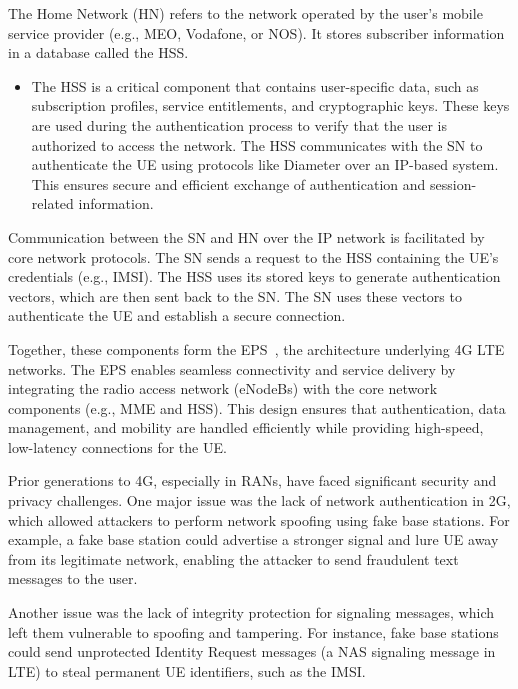 The Home Network (\ac{HN}) refers to the network operated by the user's mobile service provider (e.g., MEO, Vodafone, or NOS). It stores subscriber information in a database called the \ac{HSS}.

\begin{itemize}
    \item {
        The \ac{HSS} is a critical component that contains user-specific data, such as subscription profiles, service entitlements, and cryptographic keys. These keys are used during the authentication process to verify that the user is authorized to access the network. The \ac{HSS} communicates with the \ac{SN} to authenticate the \ac{UE} using protocols like Diameter over an IP-based system. This ensures secure and efficient exchange of authentication and session-related information.
    }
\end{itemize}

Communication between the \ac{SN} and \ac{HN} over the IP network is facilitated by core network protocols. The \ac{SN} sends a request to the \ac{HSS} containing the \ac{UE}’s credentials (e.g., \ac{IMSI}). The \ac{HSS} uses its stored keys to generate authentication vectors, which are then sent back to the \ac{SN}. The \ac{SN} uses these vectors to authenticate the \ac{UE} and establish a secure connection.

Together, these components form the \ac{EPS}~\cite{cbl-comp-4G-5g-p3}, the architecture underlying \ac{4G} \ac{LTE} networks. The \ac{EPS} enables seamless connectivity and service delivery by integrating the radio access network (\acp{eNodeB}) with the core network components (e.g., \ac{MME} and \ac{HSS}). This design ensures that authentication, data management, and mobility are handled efficiently while providing high-speed, low-latency connections for the \ac{UE}.

Prior generations to \ac{4G}, especially in \acp{RAN}, have faced significant security and privacy challenges. One major issue was the lack of network authentication in \ac{2G}, which allowed attackers to perform network spoofing using fake base stations. For example, a fake base station could advertise a stronger signal and lure \ac{UE} away from its legitimate network, enabling the attacker to send fraudulent text messages to the user.

Another issue was the lack of integrity protection for signaling messages, which left them vulnerable to spoofing and tampering. For instance, fake base stations could send unprotected Identity Request messages (a \ac{NAS} signaling message in \ac{LTE}) to steal permanent \ac{UE} identifiers, such as the \ac{IMSI}.

